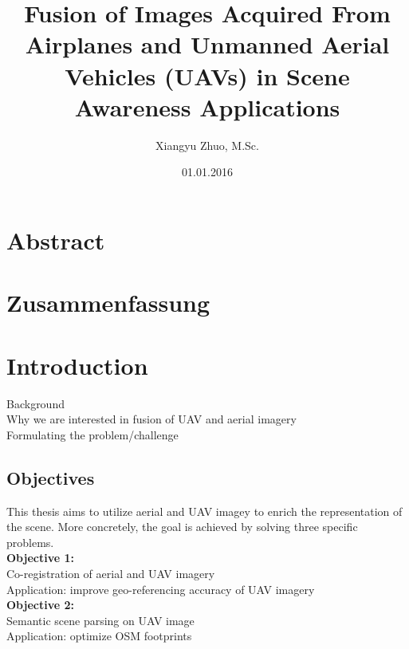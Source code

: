 \documentclass[%
  headings = standardclasses, %
]{tumDiss}
\title{%
  Fusion of Images Acquired From Airplanes and Unmanned Aerial Vehicles (UAVs) in Scene Awareness Applications\\
}
\author{Xiangyu Zhuo, M.Sc.}
\date{01.01.2016}
\begin{document}
\frontmatter
\maketitle



\chapter{Abstract}




\chapter{Zusammenfassung}




\tableofcontents
\listoffigures
\listoftables



\mainmatter
\chapter{Introduction}
\label{chap:introduction}
Background\\
Why we are interested in fusion of UAV and aerial imagery\\
Formulating the problem/challenge\\
\section{Objectives}
This thesis aims to utilize aerial and UAV imagey to enrich the representation of the scene. More concretely, the goal is achieved by solving three specific problems.\\

\textbf{Objective 1:}\\
Co-registration of aerial and UAV imagery\\
Application: improve geo-referencing accuracy of UAV imagery\\

\textbf{Objective 2:}\\
Semantic scene parsing on UAV image\\
Application: optimize OSM footprints\\
\end{document}
